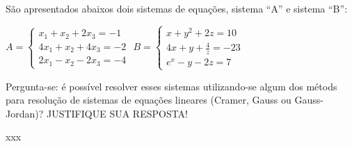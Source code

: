 \documentclass[pdftex, brazil, 12pt, oneside, addpoints]{exam}
\begin{document}
\newpage
\begin{questions}
\setlength\linefillthickness{0.2pt}

\question
São apresentados abaixos dois sistemas de equações, sistema ``A'' e
sistema ``B'':
\begin{center}$A = \begin{cases}
  x_1 + x_2 + 2x_3 = -1\\
  4x_1 + x_2 + 4x_3 = -2\\
  2x_1 - x_2 - 2x_3 = -4
\end{cases}$
\hspace{2cm}
$B = \begin{cases}
  x + y^2 + 2z = 10\\
  4x + y + \frac{4}{z} = -23\\
  e^x - y - 2z = 7
\end{cases}$
\end{center}
Pergunta-se: é possível resolver esses sistemas utilizando-se algum
dos métods para resolução de sistemas de equações lineares (Cramer,
Gauss ou Gauss-Jordan)? JUSTIFIQUE SUA RESPOSTA!
\begin{solutionorlines}[1.25in]
  xxx
\end{solutionorlines}


\end{questions}
\end{document}
